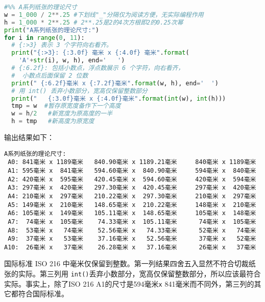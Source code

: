 \documentclass[main.tex]{subfiles}
\begin{document}
\vspace{.4cm}
\begin{spacing}{0.8}
	\begin{small}
	\begin{lstlisting}[language=Python]
#%% A系列纸张的理论尺寸
w = 1_000 / 2**.25 #下划线"_"分隔仅为阅读方便，无实际编程作用
h = 1_000 * 2**.25 # 2**.25是2的4次方根即2的0.25次幂 
print("A系列纸张的理论尺寸:")
for i in range(0, 11):
  # {:>3} 表示 3 个字符向右看齐。
  print("{:>3}: {:3.0f} 毫米 x {:4.0f} 毫米".format(
    'A'+str(i), w, h), end='   ')
  # {:6.2f}: 包括小数点，浮点数展示 6 个字符，向右看齐，
  #  小数点后面保留 2 位数
  print(" {:6.2f}毫米 x {:7.2f}毫米".format(w, h), end='  ')
  # 用 int() 丢弃小数部分，宽高仅保留整数部分
  print("   {:3.0f}毫米 x {:4.0f}毫米".format(int(w), int(h)))
  tmp = w  #暂存原宽度备作下一个高度
  w = h/2   #新宽度为原高度的一半
  h = tmp   #新高度为原宽度
\end{lstlisting}
\end{small}
\end{spacing}
\vspace{.4cm}\label{a_paper_py}
输出结果如下：
\vspace{.4cm}\label{a_paper_py}
\begin{spacing}{0.8}
	\begin{small}
\begin{lstlisting}
A系列纸张的理论尺寸:
 A0: 841毫米 x 1189毫米   840.90毫米 x 1189.21毫米     840毫米 x 1189毫米
 A1: 595毫米 x  841毫米   594.60毫米 x  840.90毫米     594毫米 x  840毫米
 A2: 420毫米 x  595毫米   420.45毫米 x  594.60毫米     420毫米 x  594毫米
 A3: 297毫米 x  420毫米   297.30毫米 x  420.45毫米     297毫米 x  420毫米
 A4: 210毫米 x  297毫米   210.22毫米 x  297.30毫米     210毫米 x  297毫米
 A5: 149毫米 x  210毫米   148.65毫米 x  210.22毫米     148毫米 x  210毫米
 A6: 105毫米 x  149毫米   105.11毫米 x  148.65毫米     105毫米 x  148毫米
 A7:  74毫米 x  105毫米    74.33毫米 x  105.11毫米      74毫米 x  105毫米
 A8:  53毫米 x   74毫米    52.56毫米 x   74.33毫米      52毫米 x   74毫米
 A9:  37毫米 x   53毫米    37.16毫米 x   52.56毫米      37毫米 x   52毫米
A10:  26毫米 x   37毫米    26.28毫米 x   37.16毫米      26毫米 x   37毫米\end{lstlisting}
\end{small}
\end{spacing}
\vspace{.4cm}\label{a_paper_py}
国际标准 ISO 216 中毫米仅保留到整数。第一列结果四舍五入显然不符合切裁纸张的实际。第三列用 \texttt{int()}丢弃小数部分，宽高仅保留整数部分，所以应该最符合实际。事实上，除了ISO 216 A1的尺寸是594毫米\texttt{x}{ }841毫米而不同外，第三列的其它都符合国际标准。
\end{document}
